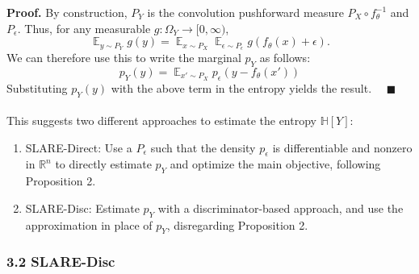 \documentclass{NSF}
\newcommand{\E} {
    \mathop{\mathbb{E}}
}
\begin{document}
\textbf{Proof.} By construction, $P_Y$ is the convolution pushforward
measure $P_X \circ f_\theta^{-1}$ and $P_\epsilon$. Thus, for any measurable
$g: \Omega_Y \rightarrow [0, \infty)$,
\[
  \E_{y\sim P_Y} g(y) = \E_{x\sim P_X} \E_{\epsilon \sim P_\epsilon} g(f_\theta(x)+\epsilon).
\]
We can therefore use this to write the marginal $p_Y$ as follows:
\[
    p_Y(y) = \E_{x' \sim P_X} p_\epsilon(y - f_\theta(x'))
\]
Substituting $p_Y(y)$ with the above term in the entropy yields the result.
$\quad\blacksquare$
\\
\\
This suggests two different approaches to estimate the entropy $\mathbb{H}[Y]$:
\begin{enumerate}
\item SLARE-Direct: Use a $P_\epsilon$ such that the density $p_\epsilon$ is
differentiable and nonzero in $\mathbb{R}^n$ to directly estimate $p_Y$ and optimize the
main objective, following Proposition 2.
\item SLARE-Disc: Estimate $p_Y$ with a discriminator-based approach, and use the
approximation in place of $p_Y$, disregarding Proposition 2.
\end{enumerate}

\subsubsection{3.2 SLARE-Disc}
\end{document}
